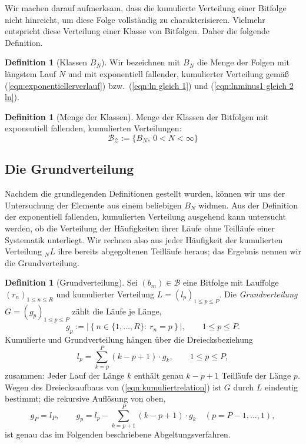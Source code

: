 \documentclass[11pt,a4paper]{scrartcl}
\theoremstyle{plain}
\theoremstyle{definition}
\newtheorem{defi}[satz]{Definition}
\theoremstyle{remark}
\begin{document}
\noindent Wir machen darauf aufmerksam, dass die kumulierte Verteilung
einer Bitfolge nicht hinreicht, um diese Folge vollständig zu
charakterisieren. Vielmehr entspricht diese Verteilung einer Klasse von
Bitfolgen. Daher die folgende Definition.

\begin{defi}[Klassen $B_N$]\label{defi:bn}
Wir bezeichnen mit $B_N$ die Menge der Folgen mit längstem Lauf $N$ und
mit exponentiell fallender, kumulierter Verteilung gemäß
(\ref{eqn:exponentiellerverlauf}) bzw.~(\ref{eqn:ln gleich 1}) und
(\ref{eqn:lnminus1 gleich 2 ln}).
\end{defi}

\begin{defi}[Menge der Klassen]\label{defi:bz}
Menge der Klassen der Bitfolgen mit exponentiell fallenden, kumulierten
Verteilungen:
\begin{equation}\label{eqn:mengederklassen}
  \mathcal{B_Z} := \{B_N,\ 0< N<\infty \}
\end{equation}
\end{defi}

\subsection{Die Grundverteilung}

Nachdem die grundlegenden Definitionen gestellt wurden, können wir uns
der Untersuchung der Elemente aus einem beliebigen $B_N$ widmen. Aus
der Definition der exponentiell fallenden, kumulierten Verteilung
ausgehend kann untersucht werden, ob die Verteilung der Häufigkeiten
ihrer Läufe ohne Teilläufe einer Systematik unterliegt. Wir rechnen
also aus jeder Häufigkeit der kumulierten Verteilung $_NL$ ihre bereits
abgegoltenen Teilläufe heraus; das Ergebnis nennen wir die
Grundverteilung.

\begin{defi}[Grundverteilung]\label{defi:grundverteilung}
Sei $(b_m)\in\mathcal B$ eine Bitfolge mit Lauffolge $(r_n)_{1\leq n\leq R}$
und kumulierter Verteilung $L=(l_p)_{1\leq p\leq P}$. Die
\emph{Grundverteilung} $G=(g_p)_{1\leq p\leq P}$ zählt die Läufe je Länge,
\begin{equation}\label{eqn:grunddef}
  g_p:=\left|\left\{n\in\{1,\dots,R\}:\ r_n=p\right\}\right|,\qquad 1\leq p\leq P.
\end{equation}
Kumulierte und Grundverteilung hängen über die Dreiecksbeziehung
\begin{equation}\label{eqn:kumuliertrelation}
  l_p=\sum_{k=p}^{P}\left(k-p+1\right)\cdot g_k,\qquad 1\leq p\leq P,
\end{equation}
zusammen: Jeder Lauf der Länge $k$ enthält genau $k-p+1$ Teilläufe der
Länge $p$. Wegen des Dreiecksaufbaus von (\ref{eqn:kumuliertrelation}) ist
$G$ durch $L$ eindeutig bestimmt; die rekursive Auflösung von oben,
\begin{equation}\label{eqn:abgeltungrekursiv}
  g_P=l_P,\qquad
  g_p=l_p-\sum_{k=p+1}^{P}\left(k-p+1\right)\cdot g_k
  \quad(p=P-1,\dots,1),
\end{equation}
ist genau das im Folgenden beschriebene Abgeltungsverfahren.
\end{defi}
\end{document}
